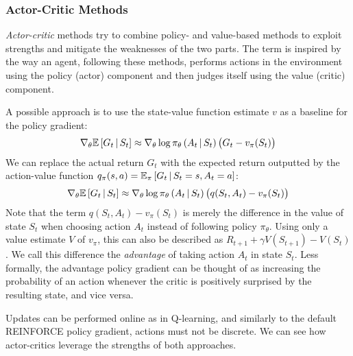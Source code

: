 \subsubsection{Actor-Critic Methods}
\textit{Actor-critic} methods \cite{bible} try to combine policy- and value-based methods to exploit strengths and mitigate the weaknesses of the two parts. The term is inspired by the way an agent, following these methods, performs actions in the environment using the policy (actor) component and then judges itself using the value (critic) component.

A possible approach is to use the state-value function estimate $v$ as a baseline for the policy gradient:
\begin{equation*}
    \nabla_\theta \mathbb{E}\left[G_t \,\middle|\, S_t \right] \approx \nabla_\theta \log \pi_\theta\left(A_t \,\middle|\, S_t\right) \left(G_t - v_\pi(S_t)\right)
\end{equation*}
We can replace the actual return $G_t$ with the expected return outputted by the action-value function $q_\pi(s, a) = \mathbb{E}_\pi \left[G_t \,\middle|\, S_t = s, A_t = a\right]$:
\begin{equation*}
    \nabla_\theta \mathbb{E}\left[G_t \,\middle|\, S_t \right] \approx \nabla_\theta \log \pi_\theta\left(A_t \,\middle|\, S_t\right) \left(q(S_t, A_t) - v_\pi(S_t)\right)
\end{equation*}
Note that the term $q(S_t, A_t) - v_\pi(S_t)$ is merely the difference in the value of state $S_t$ when choosing action $A_t$ instead of following policy $\pi_\theta$. Using only a value estimate $V$ of $v_\pi$, this can also be described as $R_{t+1} + \gamma V(S_{t+1}) - V(S_t)$ \cite{a3c}. We call this difference the \textit{advantage} of taking action $A_t$ in state $S_t$. Less formally, the advantage policy gradient can be thought of as increasing the probability of an action whenever the critic is positively surprised by the resulting state, and vice versa.

Updates can be performed online as in Q-learning, and similarly to the default REINFORCE policy gradient, actions must not be discrete. We can see how actor-critics leverage the strengths of both approaches.